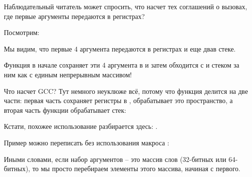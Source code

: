 \label{variadic_arith_registers}

Наблюдательный читатель может спросить, что насчет тех соглашений о вызовах, где первые аргументы передаются
в регистрах?

Посмотрим:



Мы видим, что первые 4 аргумента передаются в регистрах и еще два\EMDASH{}в стеке.

Функция  в начале сохраняет эти 4 аргумента в  и затем обходится
с  и стеком за ним как с единым непрерывным массивом!

Что насчет GCC? Тут немного неуклюже всё, потому что функция делится на две части: первая часть
сохраняет регистры в , обрабатывает это пространство, а вторая часть функции обрабатывает стек:



Кстати, похожее использование  разбирается здесь: .


Пример можно переписать без использования макроса :



Иными словами, если набор аргументов -- это массив слов (32-битных или 64-битных), то мы просто перебираем элементы
этого массива, начиная с первого.

